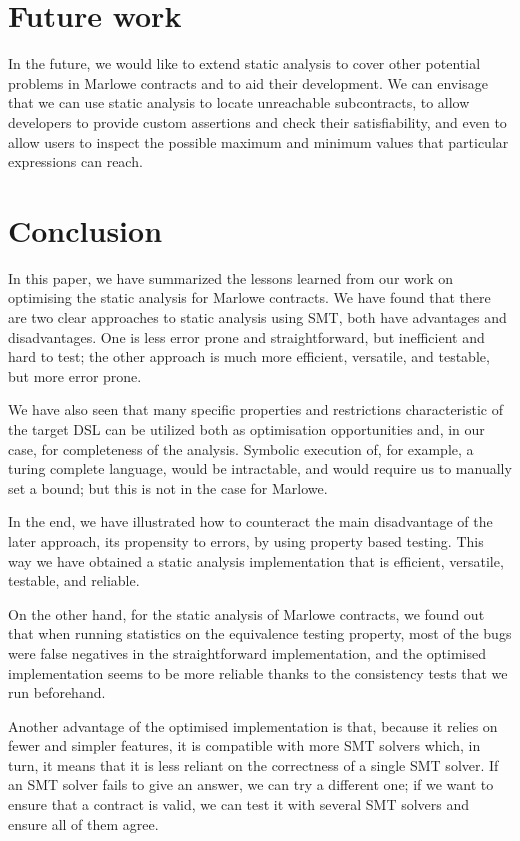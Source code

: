 \documentclass[english,runningheads]{llncs}
\begin{document}
\section{Future work}

In the future, we would like to extend static analysis to cover other
potential problems in Marlowe contracts and to aid their development.
We can envisage that we can use static analysis to locate unreachable
subcontracts, to allow developers to provide custom assertions and
check their satisfiability, and even to allow users to inspect the
possible maximum and minimum values that particular expressions can
reach. 

\section{Conclusion}

In this paper, we have summarized the lessons learned from our work
on optimising the static analysis for Marlowe contracts. We have found
that there are two clear approaches to static analysis using SMT,
both have advantages and disadvantages. One is less error prone and
straightforward, but inefficient and hard to test; the other approach
is much more efficient, versatile, and testable, but more error prone.

We have also seen that many specific properties and restrictions characteristic
of the target DSL can be utilized both as optimisation opportunities
and, in our case, for completeness of the analysis. Symbolic execution
of, for example, a turing complete language, would be intractable,
and would require us to manually set a bound; but this is not in the
case for Marlowe.

In the end, we have illustrated how to counteract the main disadvantage
of the later approach, its propensity to errors, by using property
based testing. This way we have obtained a static analysis implementation
that is efficient, versatile, testable, and reliable.

On the other hand, for the static analysis of Marlowe contracts, we
found out that when running statistics on the equivalence testing
property, most of the bugs were false negatives in the straightforward
implementation, and the optimised implementation seems to be more
reliable thanks to the consistency tests that we run beforehand.

Another advantage of the optimised implementation is that, because
it relies on fewer and simpler features, it is compatible with more
SMT solvers which, in turn, it means that it is less reliant on the
correctness of a single SMT solver. If an SMT solver fails to give
an answer, we can try a different one; if we want to ensure that a
contract is valid, we can test it with several SMT solvers and ensure
all of them agree. 



\end{document}
